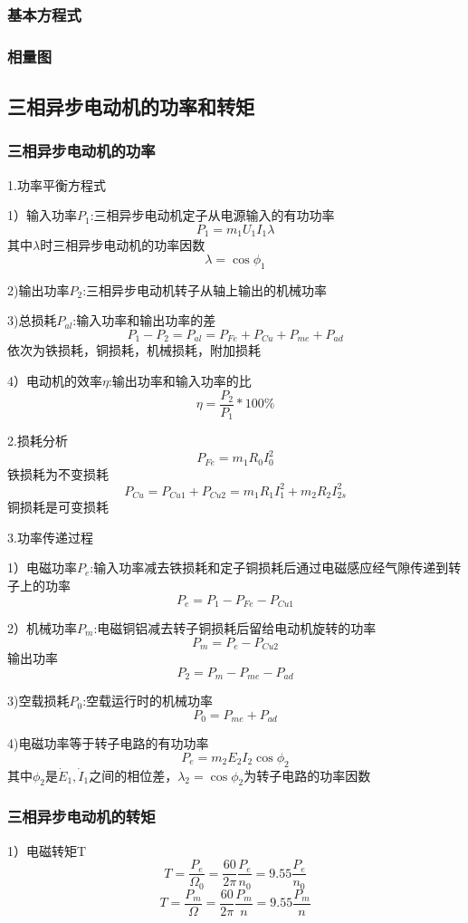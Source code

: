 \documentclass[11pt,twoside,a4paper]{ctexart}
\begin{document}
\subsubsection{基本方程式}

\subsubsection{相量图}

\subsection{三相异步电动机的功率和转矩}
\subsubsection{三相异步电动机的功率}
1.功率平衡方程式

1）输入功率$P_1$:三相异步电动机定子从电源输入的有功功率
\[P_1 = m_1U_1I_1\lambda \]
其中$\lambda$时三相异步电动机的功率因数
\[\lambda = \cos \phi_1\]

2)输出功率$P_2$:三相异步电动机转子从轴上输出的机械功率

3)总损耗$P_{al}$:输入功率和输出功率的差
\[P_1 - P_2 = P_{al} = P_{Fe} + P_{Cu} +P_{me} + P_{ad} \]
依次为铁损耗，铜损耗，机械损耗，附加损耗

4）电动机的效率$\eta $:输出功率和输入功率的比
\[\eta = \frac{P_2}{P_1}*100\% \]

2.损耗分析
\[P_{Fe} = m_1R_0I_0^2\]
铁损耗为不变损耗
\[P_{Cu} = P_{Cu1} + P_{Cu2} = m_1R_1I_1^2 + m_2R_2I_{2s}^2\]
铜损耗是可变损耗

3.功率传递过程

1）电磁功率$P_e$:输入功率减去铁损耗和定子铜损耗后通过电磁感应经气隙传递到转子上的功率
\[P_e = P_1 - P_{Fe} - P_{Cu1}\]

2）机械功率$P_m$:电磁铜铝减去转子铜损耗后留给电动机旋转的功率
\[P_m = P_e - P_{Cu2}\]
输出功率
\[P_2 = P_m - P_{me} - P_{ad}\]

3)空载损耗$P_0$:空载运行时的机械功率
\[P_0 = P_{me} + P_{ad}\]

4)电磁功率等于转子电路的有功功率
\[ P_e = m_2E_2I_2\cos \phi_2\]
其中$\phi_2$是$\dot{E}_1,\dot{I}_1$之间的相位差，$\lambda_2 = \cos \phi_2$为转子电路的功率因数

\subsubsection{三相异步电动机的转矩}
1）电磁转矩T
\[T = \frac{P_e}{\Omega_0} = \frac{60}{2\pi}\frac{P_e}{n_0} = 9.55\frac{P_e}{n_0}\]
\[T = \frac{P_m}{\Omega} = \frac{60}{2\pi}\frac{P_m}{n} = 9.55\frac{P_m}{n}\]
\end{document}

